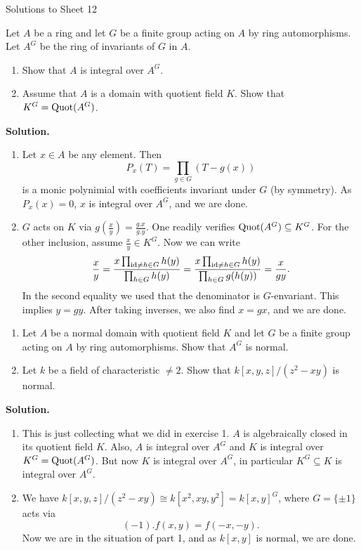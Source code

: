 \documentclass[a4paper,11pt]{article}
\begin{document}
\begin{center}
    \huge{Solutions to Sheet 12}
\end{center}

Let $A$ be a ring and let $G$ be a finite group acting on $A$ by ring automorphisms.
Let $A^G$ be the ring of invariants of $G$ in $A$.
\begin{enumerate}
    \item Show that $A$ is integral over $A^G$.
    \item Assume that $A$ is a domain with quotient field $K$. Show that $K^G = 
        \mathrm{Quot}(A^G)$. 
\end{enumerate}
\textbf{Solution.}
\begin{enumerate}
    \item Let $x \in A$ be any element. Then 
        \begin{equation*}
            P_x(T) = \prod_{g \in G}(T-g(x))
        \end{equation*}
        is a monic polynimial with coefficients invariant under $G$ (by symmetry). 
        As $P_x(x) = 0$, $x$ is integral over $A^G$, and we are done.
    \item $G$ acts on $K$ via $g (\frac xy) = \frac{g.x}{g.y}$. One readily 
        verifies $\mathrm{Quot}(A^G) \subseteq K^G$. For the other inclusion, assume 
        $\frac xy \in K^G$. Now we can write
        \begin{equation*}
            \frac {x}{y} = \frac {x\prod_{\operatorname{id} \neq h \in G} h(y)}{\prod_{h
                \in G} h(y)} = \frac {x \prod_{\operatorname{id} \neq h \in G}
                h(y)}{\prod_{h \in G} g(h(y))} = \frac{x}{gy}.
        \end{equation*}
        In the second equality we used that the denominator is $G$-envariant.
        This implies $y = gy$. After taking inverses, we also find 
        $x = gx$, and we are done.
\end{enumerate}

\begin{enumerate}
    \item Let $A$ be a normal domain with quotient field $K$ and let $G$ be a
        finite group acting on $A$ by ring automorphisms. Show that $A^G$ is
        normal.
    \item Let $k$ be a field of characteristic $\neq 2$. Show that
        $k[x,y,z]/(z^2 - xy)$ is normal. 
\end{enumerate}

\textbf{Solution.}
\begin{enumerate}
    \item This is just collecting what we did in exercise 1. $A$ is algebraically
        closed in its quotient field $K$. Also, $A$ is integral over $A^G$ and
        $K$ is integral over $K^G = \mathrm{Quot}(A^G)$. But now $K$ is integral over
        $A^G$, in particular $K^G \subseteq K$ is integral over $A^G$. 

    \item We have $k[x,y,z]/(z^2-xy) \cong k[x^2, xy, y^2] = k[x,y]^G$,
        where $G = \{\pm 1\}$ acts via 
        $$(-1).f(x,y) = f(-x,-y).$$
        Now we are in the situation of part 1, and as $k[x,y]$ is normal, we are 
        done.
\end{enumerate}
\end{document}
